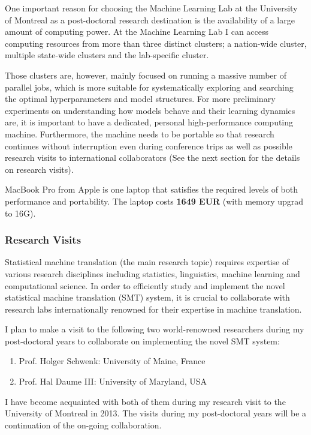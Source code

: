 \documentclass[11pt, oneside]{essay}
\begin{document}
One important reason for choosing the Machine Learning Lab at the
University of Montreal as a post-doctoral research destination is
the availability of a large amount of computing power. At
the Machine Learning Lab I can access computing resources from
more than three distinct clusters; a nation-wide cluster,
multiple state-wide clusters and the lab-specific cluster.

Those clusters are, however, mainly focused on running a massive
number of parallel jobs, which is more suitable for
systematically exploring and searching the optimal
hyperparameters and model structures. For more preliminary
experiments on understanding how models behave and their learning
dynamics are, it is important to have a dedicated, personal
high-performance computing machine.  Furthermore, the machine
needs to be portable so that research continues without
interruption even during conference trips as well as possible
research visits to international collaborators (See the next
section for the details on research visits).

MacBook Pro from Apple is one laptop that satisfies the required
levels of both performance and portability. The laptop costs
\textbf{1649 EUR} (with memory upgrad to 16G).


\subsubsection{Research Visits}

Statistical machine translation (the main research topic)
requires expertise of various research disciplines including
statistics, linguistics, machine learning and computational
science. In order to efficiently study and implement the novel
statistical machine translation (SMT) system, it is crucial to
collaborate with research labs internationally renowned for their
expertise in machine translation.

I plan to make a visit to the following two world-renowned
researchers during my post-doctoral years to collaborate on
implementing the novel SMT system:
\begin{enumerate}
\item Prof. Holger Schwenk: University of Maine, France
\item Prof. Hal Daume III: University of Maryland, USA
\end{enumerate}

I have become acquainted with both of them during my research
visit to the University of Montreal in 2013. The visits during my
post-doctoral years will be a continuation of the on-going
collaboration.
\end{document}

